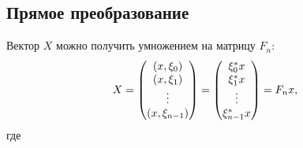 \subsection{Прямое преобразование}

Вектор $X$ можно получить умножением на матрицу $F_n$:
\[
    X
    = \begin{pmatrix}
          \left ( x, \xi_0 \right )     \\
          \left ( x, \xi_1 \right )     \\
          \vdots                       \\
          \left ( x, \xi_{n-1} \right ) \\
    \end{pmatrix}
    = \begin{pmatrix}
          \xi_0^* x     \\
          \xi_1^* x     \\
          \vdots        \\
          \xi_{n-1}^* x \\
    \end{pmatrix}
    = F_n x ,
\]
где
